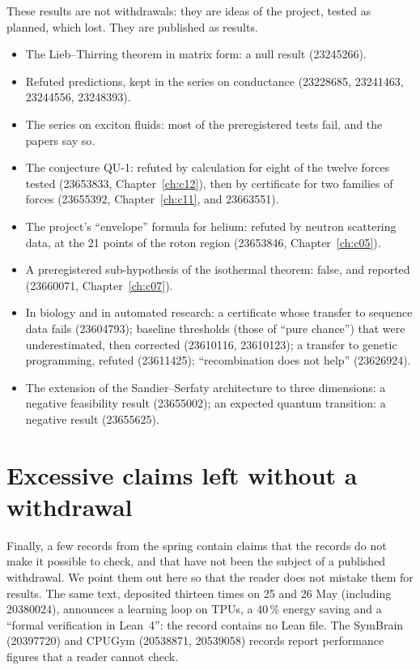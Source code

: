 These results are not withdrawals: they are ideas of the project, tested as planned, which lost. They are published as
results.
\begin{itemize}
\item The Lieb--Thirring theorem in matrix form: a null result (23245266).
\item Refuted predictions, kept in the series on conductance (23228685, 23241463, 23244556, 23248393).
\item The series on exciton fluids: most of the preregistered tests fail, and the papers say so.
\item The conjecture QU-1: refuted by calculation for eight of the twelve forces tested (23653833,
Chapter~\ref{ch:c12}), then by certificate for two families of forces (23655392, Chapter~\ref{ch:c11}, and
23663551).
\item The project's ``envelope'' formula for helium: refuted by neutron scattering data, at the 21 points of the roton
region (23653846, Chapter~\ref{ch:c05}).
\item A preregistered sub-hypothesis of the isothermal theorem: false, and reported (23660071, Chapter~\ref{ch:c07}).
\item In biology and in automated research: a certificate whose transfer to sequence data fails (23604793); baseline
thresholds (those of ``pure chance'') that were underestimated, then corrected (23610116, 23610123); a transfer to
genetic programming, refuted (23611425); ``recombination does not help'' (23626924).
\item The extension of the Sandier--Serfaty architecture to three dimensions: a negative feasibility result
(23655002); an expected quantum transition: a negative result (23655625).
\end{itemize}

\section{Excessive claims left without a withdrawal}

Finally, a few records from the spring contain claims that the records do not make it possible to check, and that
have not been the subject of a published withdrawal. We point them out here so that the reader does not mistake them
for results. The same text, deposited thirteen times on 25 and 26 May (including 20380024), announces a learning loop
on TPUs, a 40\,\% energy saving and a ``formal verification in Lean~4'': the record contains no Lean file. The SymBrain
(20397720) and CPUGym (20538871, 20539058) records report performance figures that a reader cannot check.
